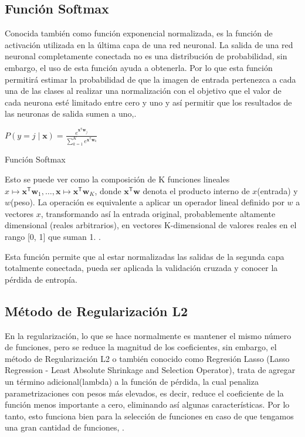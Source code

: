 	\subsection{Función Softmax}
		Conocida también como función exponencial normalizada, es la función de activación utilizada en la última capa de una red neuronal. La salida de una red neuronal completamente conectada no es una distribución de probabilidad, sin embargo, el uso de esta función ayuda a obtenerla. Por lo que esta función permitirá estimar la probabilidad de que la imagen de entrada pertenezca a cada una de las clases al realizar una normalización con el objetivo que el valor de cada neurona esté limitado entre cero y uno y así permitir que los resultados de las neuronas de salida sumen a uno,\citep{Bishop}. 

			\begingroup\makeatletter{}\check@mathfonts
			\begin{center}
			${\displaystyle P(y=j\mid \mathbf {x} )={\frac {e^{\mathbf {x} ^{\mathsf {T}}\mathbf {w} _{j}}}{\sum _{k=1}^{K}e^{\mathbf {x} ^{\mathsf {T}}\mathbf {w} _{k}}}}}$
			\end{center}
			\begin{center}
			{\small{Función Softmax}}
			\end{center}
			\endgroup
			
		Esto se puede ver como la composición de K funciones lineales ${x} \mapsto \mathbf {x} ^{\mathsf {T}}\mathbf {w} _{1},\ldots ,\mathbf {x} \mapsto \mathbf {x} ^{\mathsf {T}}\mathbf {w} _{K}$, donde ${\mathbf {x} ^{\mathsf {T}}\mathbf {w}}$ denota el producto interno de $x$(entrada) y $w$(peso).	La operación es equivalente a aplicar un operador lineal definido por $ w $ a vectores $ x $, transformando así la entrada original, probablemente altamente dimensional (reales arbitrarios), en vectores K-dimensional de valores reales en el rango [0, 1] que suman 1. \citep{Bishop}. 

		Esta función permite que al estar normalizadas las salidas de la segunda capa totalmente conectada, pueda ser aplicada la validación cruzada y conocer la pérdida de entropía.

	
	\subsection{Método de Regularización L2}
		En la regularización, lo que se hace normalmente es mantener el mismo número de funciones, pero se reduce la magnitud de los coeficientes, sin embargo, el método de Regularización L2 o también conocido como Regresión Lasso (Lasso Regression - Least Absolute Shrinkage and Selection Operator), trata de agregar un término adicional(lambda) a la función de pérdida, la cual penaliza parametrizaciones con pesos más elevados, es decir, reduce el coeficiente de la función menos importante a cero, eliminando así algunas características. Por lo tanto, esto funciona bien para la selección de funciones en caso de que tengamos una gran cantidad de funciones, \citep{AulaMLP}.

